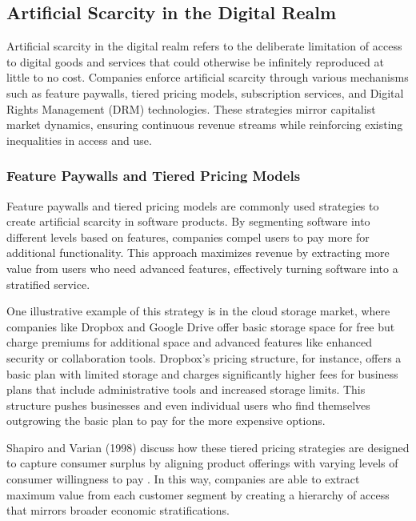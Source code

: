 \begin{refsection}
\subsection{Artificial Scarcity in the Digital Realm}

Artificial scarcity in the digital realm refers to the deliberate limitation of access to digital goods and services that could otherwise be infinitely reproduced at little to no cost. Companies enforce artificial scarcity through various mechanisms such as feature paywalls, tiered pricing models, subscription services, and Digital Rights Management (DRM) technologies. These strategies mirror capitalist market dynamics, ensuring continuous revenue streams while reinforcing existing inequalities in access and use.

\subsubsection{Feature Paywalls and Tiered Pricing Models}

Feature paywalls and tiered pricing models are commonly used strategies to create artificial scarcity in software products. By segmenting software into different levels based on features, companies compel users to pay more for additional functionality. This approach maximizes revenue by extracting more value from users who need advanced features, effectively turning software into a stratified service.

One illustrative example of this strategy is in the cloud storage market, where companies like Dropbox and Google Drive offer basic storage space for free but charge premiums for additional space and advanced features like enhanced security or collaboration tools. Dropbox's pricing structure, for instance, offers a basic plan with limited storage and charges significantly higher fees for business plans that include administrative tools and increased storage limits. This structure pushes businesses and even individual users who find themselves outgrowing the basic plan to pay for the more expensive options.

Shapiro and Varian (1998) discuss how these tiered pricing strategies are designed to capture consumer surplus by aligning product offerings with varying levels of consumer willingness to pay \cite[pp.~110-111]{shapiro1998information}. In this way, companies are able to extract maximum value from each customer segment by creating a hierarchy of access that mirrors broader economic stratifications.


\end{refsection}
